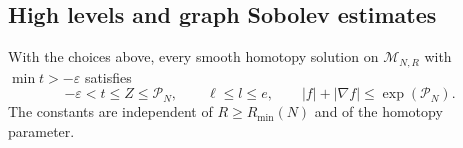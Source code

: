 \subsection{High levels and graph Sobolev estimates}

\begin{proposition}
\label{alg:distortion-proposition}
With the choices above, every smooth homotopy solution on
$\mathcal M_{N,R}$ with $\min t> -\varepsilon$ satisfies
\begin{equation}
 -\varepsilon<t\leq Z\leq\mathcal P_N,\qquad
 \ell\leq l\leq e,\qquad
 |f|+|\nabla f|\leq\exp(\mathcal P_N).
 \label{alg:distortion}
\end{equation}
The constants are independent of $R\geq R_{\min}(N)$ and of the
homotopy parameter.
\end{proposition}

